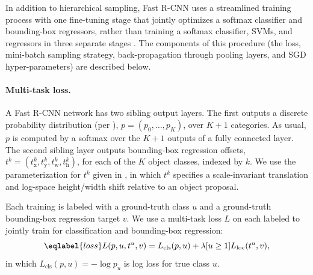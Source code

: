 In addition to hierarchical sampling, Fast R-CNN uses a streamlined training process with one fine-tuning stage that jointly optimizes a softmax classifier and bounding-box regressors, rather than training a softmax classifier, SVMs, and regressors in three separate stages \cite{girshick2014rcnn,he2014spp}.
The components of this procedure (the loss, mini-batch sampling strategy, back-propagation through \roi pooling layers, and SGD hyper-parameters) are described below.

\paragraph{Multi-task loss.}
A Fast R-CNN network has two sibling output layers.
The first outputs a discrete probability distribution (per \roi), $p = (p_0,\ldots,p_K)$, over $K + 1$ categories.
As usual, $p$ is computed by a softmax over the $K + 1$ outputs of a fully connected layer.
The second sibling layer outputs bounding-box regression offsets, $t^{k} = \left(t^{k}_\textrm{x}, t^{k}_\textrm{y}, t^{k}_\textrm{w}, t^{k}_\textrm{h}\right)$, for each of the $K$ object classes, indexed by $k$.
We use the parameterization for $t^{k}$ given in \cite{girshick2014rcnn}, in which $t^k$ specifies a scale-invariant translation and log-space height/width shift relative to an object proposal.

Each training \roi is labeled with a ground-truth class $u$ and a ground-truth bounding-box regression target $v$.
We use a multi-task loss $L$ on each labeled {\roi} to jointly train for classification and bounding-box regression:
\begin{equation}
\eqlabel{loss}
L(p, u, t^u, v) = L_\textrm{cls}(p, u) + \lambda [u \ge 1] L_\textrm{loc}(t^u, v),
\end{equation}
in which $L_\textrm{cls}(p, u) = -\log p_u$ is log loss for true class $u$.

